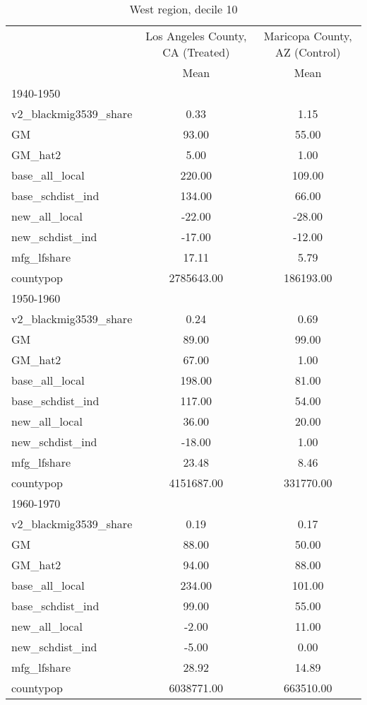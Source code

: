 \begin{table}[htbp]\centering
\def\sym#1{\ifmmode^{#1}\else\(^{#1}\)\fi}
\caption{West region, decile 10 \label{tab1}}
\begin{tabular}{l*{2}{c}}
\toprule
                    &\multicolumn{1}{c}{Los Angeles County, CA (Treated)}&\multicolumn{1}{c}{Maricopa County, AZ (Control)}\\
                    &        Mean&        Mean\\
\midrule
1940-1950           &            &            \\
v2\_blackmig3539\_share&        0.33&        1.15\\
GM                  &       93.00&       55.00\\
GM\_hat2             &        5.00&        1.00\\
base\_all\_local      &      220.00&      109.00\\
base\_schdist\_ind    &      134.00&       66.00\\
new\_all\_local       &      -22.00&      -28.00\\
new\_schdist\_ind     &      -17.00&      -12.00\\
mfg\_lfshare         &       17.11&        5.79\\
countypop           &  2785643.00&   186193.00\\
\midrule
1950-1960           &            &            \\
v2\_blackmig3539\_share&        0.24&        0.69\\
GM                  &       89.00&       99.00\\
GM\_hat2             &       67.00&        1.00\\
base\_all\_local      &      198.00&       81.00\\
base\_schdist\_ind    &      117.00&       54.00\\
new\_all\_local       &       36.00&       20.00\\
new\_schdist\_ind     &      -18.00&        1.00\\
mfg\_lfshare         &       23.48&        8.46\\
countypop           &  4151687.00&   331770.00\\
\midrule
1960-1970           &            &            \\
v2\_blackmig3539\_share&        0.19&        0.17\\
GM                  &       88.00&       50.00\\
GM\_hat2             &       94.00&       88.00\\
base\_all\_local      &      234.00&      101.00\\
base\_schdist\_ind    &       99.00&       55.00\\
new\_all\_local       &       -2.00&       11.00\\
new\_schdist\_ind     &       -5.00&        0.00\\
mfg\_lfshare         &       28.92&       14.89\\
countypop           &  6038771.00&   663510.00\\
\bottomrule
\end{tabular}
\end{table}

